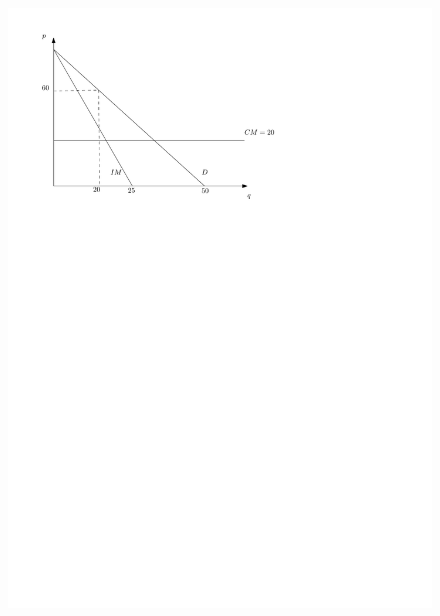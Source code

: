 \begin{center}
\begin{figure}[H]
       \includegraphics[]{Clases/figs/ejercicio} 
   \end{figure}
\end{center}
